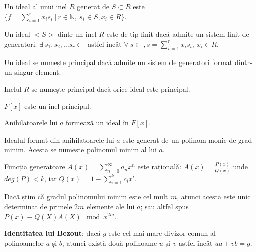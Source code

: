 \begin{defn}
  Un ideal al unui inel $R$ generat de $S \subset R$ este
  $\{f = \displaystyle\sum\limits_{i=1}^{r} x_{i}s_{i} \ | \ r \in \mathbb{N}, \ s_{i} \in S, x_{i} \in R\}$.
\end{defn}

\begin{defn}
  Un ideal $<S>$ dintr-un inel $R$ este de tip finit dacă admite un sistem finit de generatori:
  $\exists \ s_{1}, s_{2}, \ldots s_{r} \in \ $  astfel încât
  $\forall \ s \in \ , s = \displaystyle\sum\limits_{i=1}^{r} x_{i} s_{i}, \ x_{i} \in R$.
\end{defn}

\begin{defn}
  Un ideal se numește principal dacă admite un sistem de generatori format
  dintr-un singur element.
\end{defn}

\begin{defn}
  Inelul $R$ se numește principal dacă orice ideal este principal.
\end{defn}

\begin{thm}
  $F[x]$ este un inel principal.
\end{thm}

\begin{lem}
  Anihilatoarele lui $a$ formează un ideal în $F[x]$.
\end{lem}

\begin{clr}
  Idealul format din anihilatoarele lui $a$ este generat de un polinom monic de
  grad minim. Acesta se numește polinomul minim al lui $a$.
\end{clr}

\begin{thm}
  Funcția generatoare $A(x) = \displaystyle\sum\limits_{n=0}^{\infty} a_{n}x^{n}$ este rațională:
  $A(x) = \frac{P(x)}{Q(x)}$ unde $deg(P) < k$, iar $Q(x) = 1 - \displaystyle\sum\limits_{i=1}^{k} c_{i}x^{i}$.
\end{thm}

\begin{thm}
  Dacă știm că gradul polinomului minim este cel mult $m$, atunci acesta este
  unic determinat de primele $2m$ elemente ale lui $a$; sau altfel spus
  $P(x) \equiv Q(X) A(X) \mod x^{2m}$.
\end{thm}

\noindent \textbf{Identitatea lui Bezout}: dacă $g$ este cel mai mare divizor comun al
polinoamelor $a$ și $b$, atunci există două polinoame $u$ și $v$ astfel încât
$ua + vb = g$.

